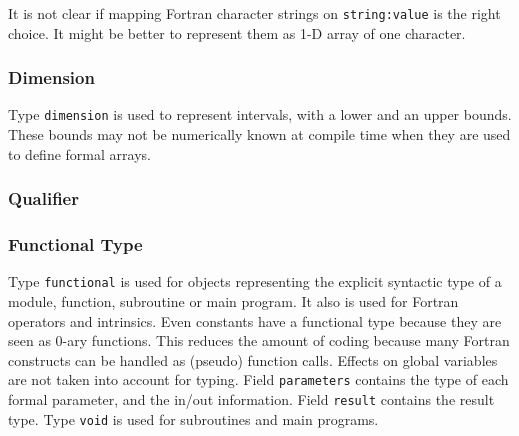 \documentclass[a4paper]{article}
\begin{document}
It is not clear if mapping Fortran character strings on
\verb/string:value/ is the right choice. It might be better to
represent them as 1-D array of one character.

\subsubsection{Dimension}
\label{subsubsection-dimension}


Type \texttt{dimension} is used to represent intervals, with a lower and
an upper bounds. These bounds may not be numerically known at compile
time when they are used to define formal arrays.

\begin{comment}
Le domaine \verb/dimension/ permet de repr�senter une dimension d'un
tableau, c'est-�-dire un couple borne inf�rieure -- sous-domaine
\verb/lower/ -- borne sup�rieure -- sous-domaine \verb/upper/.
\end{comment}

\subsubsection{Qualifier}
\label{subsubsection-qualifier}


\subsubsection{Functional Type}
\label{subsubsection-functional}


Type \texttt{functional} is used for objects representing the explicit
syntactic type of a module, function, subroutine or main program. It
also is used for Fortran operators and intrinsics. Even constants have a
functional type because they are seen as 0-ary functions. This reduces
the amount of coding because many Fortran constructs can be handled as
(pseudo) function calls. Effects on global variables are not taken into
account for typing. Field \texttt{parameters} contains the type of each
formal parameter, and the in/out information. Field \texttt{result}
contains the result type. Type \texttt{void} is used for subroutines and
main programs.
\end{document}
